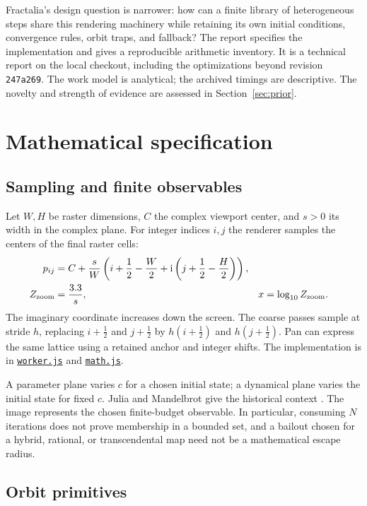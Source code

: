 \documentclass[11pt,a4paper]{article}
\numberwithin{equation}{section}
\newcommand{\ii}{\mathrm{i}}
\newcommand{\code}[1]{\texttt{#1}}
\begin{document}
Fractalia's design question is narrower: how can a finite library of
heterogeneous steps share this rendering machinery while retaining its own
initial conditions, convergence rules, orbit traps, and fallback? The
report specifies the implementation and gives a reproducible arithmetic
inventory. It is a technical report on the local checkout, including the
optimizations beyond revision \code{247a269}. The work model is analytical;
the archived timings are descriptive. The novelty and strength of evidence
are assessed in Section~\ref{sec:prior}.

\section{Mathematical specification}\label{sec:maps}

\subsection{Sampling and finite observables}

Let \(W,H\) be raster dimensions, \(C\) the complex viewport center, and
\(s>0\) its width in the complex plane. For integer indices \(i,j\) the
renderer samples the centers of the final raster cells:
\begin{align}
  p_{ij}
  &= C+\frac{s}{W}
     \left(i+\frac12-\frac W2+\ii\left(j+\frac12-\frac H2\right)\right),
     \label{eq:grid}\\
  Z_{\rm zoom}&=\frac{3.3}{s},
  & x&=\log_{10} Z_{\rm zoom}. \label{eq:zoom}
\end{align}
The imaginary coordinate increases down the screen. The coarse passes
sample at stride \(h\), replacing \(i+\tfrac12\) and \(j+\tfrac12\) by
\(h(i+\tfrac12)\) and \(h(j+\tfrac12)\). Pan can express the same lattice
using a retained anchor and integer shifts. The implementation is in
\href{../dist/worker.js}{\code{worker.js}} and
\href{../dist/math.js}{\code{math.js}}.

A parameter plane varies \(c\) for a chosen initial state; a dynamical
plane varies the initial state for fixed \(c\). Julia and Mandelbrot give the
historical context \cite{julia,mandelbrot}. The image represents the chosen
finite-budget observable. In particular, consuming \(N\) iterations does
not prove membership in a bounded set, and a bailout chosen for a hybrid,
rational, or transcendental map need not be a mathematical escape radius.

\subsection{Orbit primitives}
\end{document}
